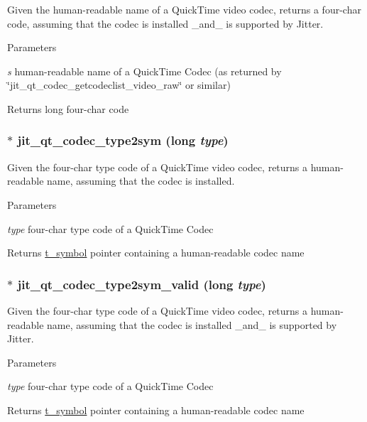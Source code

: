 Given the human-\/readable name of a QuickTime video codec, returns a four-\/char code, assuming that the codec is installed \_\-and\_\- is supported by Jitter. 
\begin{DoxyParams}{Parameters}
\item[{\em s}]human-\/readable name of a QuickTime Codec (as returned by \char`\"{}jit\_\-qt\_\-codec\_\-getcodeclist\_\-video\_\-raw\char`\"{} or similar)\end{DoxyParams}
\begin{DoxyReturn}{Returns}
long four-\/char code 
\end{DoxyReturn}
\hypertarget{group__qtcodecmod_gaa0fb2109ffc6f7b1bb729b5ea5648684}{
\subsubsection[{jit\_\-qt\_\-codec\_\-type2sym}]{$\ast$ jit\_\-qt\_\-codec\_\-type2sym (long {\em type})}}
\label{group__qtcodecmod_gaa0fb2109ffc6f7b1bb729b5ea5648684}


Given the four-\/char type code of a QuickTime video codec, returns a human-\/readable name, assuming that the codec is installed. 
\begin{DoxyParams}{Parameters}
\item[{\em type}]four-\/char type code of a QuickTime Codec\end{DoxyParams}
\begin{DoxyReturn}{Returns}
\hyperlink{structt__symbol}{t\_\-symbol} pointer containing a human-\/readable codec name 
\end{DoxyReturn}
\hypertarget{group__qtcodecmod_gaadb834b497ccbddd8b68ca4407829d85}{
\subsubsection[{jit\_\-qt\_\-codec\_\-type2sym\_\-valid}]{$\ast$ jit\_\-qt\_\-codec\_\-type2sym\_\-valid (long {\em type})}}
\label{group__qtcodecmod_gaadb834b497ccbddd8b68ca4407829d85}


Given the four-\/char type code of a QuickTime video codec, returns a human-\/readable name, assuming that the codec is installed \_\-and\_\- is supported by Jitter. 
\begin{DoxyParams}{Parameters}
\item[{\em type}]four-\/char type code of a QuickTime Codec\end{DoxyParams}
\begin{DoxyReturn}{Returns}
\hyperlink{structt__symbol}{t\_\-symbol} pointer containing a human-\/readable codec name 
\end{DoxyReturn}
